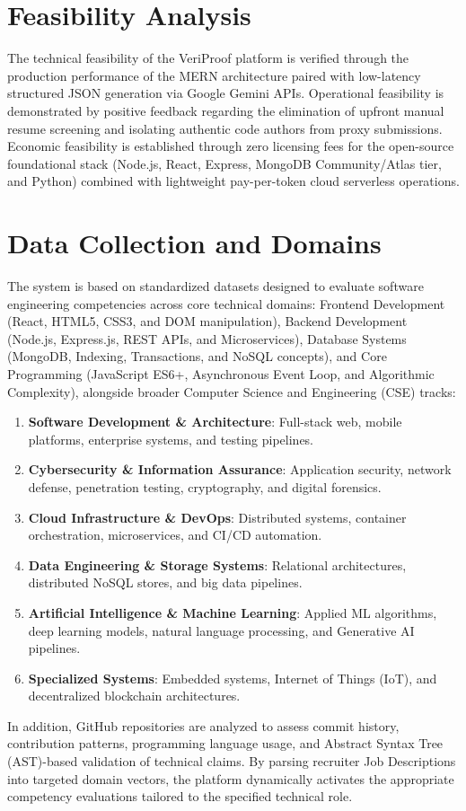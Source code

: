 \section{Feasibility Analysis}
The technical feasibility of the VeriProof platform is verified through the production performance of the MERN architecture paired with low-latency structured JSON generation via Google Gemini APIs. Operational feasibility is demonstrated by positive feedback regarding the elimination of upfront manual resume screening and isolating authentic code authors from proxy submissions. Economic feasibility is established through zero licensing fees for the open-source foundational stack (Node.js, React, Express, MongoDB Community/Atlas tier, and Python) combined with lightweight pay-per-token cloud serverless operations.

\section{Data Collection and Domains}
The system is based on standardized datasets designed to evaluate software engineering competencies across core technical domains: Frontend Development (React, HTML5, CSS3, and DOM manipulation), Backend Development (Node.js, Express.js, REST APIs, and Microservices), Database Systems (MongoDB, Indexing, Transactions, and NoSQL concepts), and Core Programming (JavaScript ES6+, Asynchronous Event Loop, and Algorithmic Complexity), alongside broader Computer Science and Engineering (CSE) tracks:
\begin{enumerate}
    \item \textbf{Software Development \& Architecture}: Full-stack web, mobile platforms, enterprise systems, and testing pipelines.
    \item \textbf{Cybersecurity \& Information Assurance}: Application security, network defense, penetration testing, cryptography, and digital forensics.
    \item \textbf{Cloud Infrastructure \& DevOps}: Distributed systems, container orchestration, microservices, and CI/CD automation.
    \item \textbf{Data Engineering \& Storage Systems}: Relational architectures, distributed NoSQL stores, and big data pipelines.
    \item \textbf{Artificial Intelligence \& Machine Learning}: Applied ML algorithms, deep learning models, natural language processing, and Generative AI pipelines.
    \item \textbf{Specialized Systems}: Embedded systems, Internet of Things (IoT), and decentralized blockchain architectures.
\end{enumerate}
In addition, GitHub repositories are analyzed to assess commit history, contribution patterns, programming language usage, and Abstract Syntax Tree (AST)-based validation of technical claims. By parsing recruiter Job Descriptions into targeted domain vectors, the platform dynamically activates the appropriate competency evaluations tailored to the specified technical role.
\clearpage

